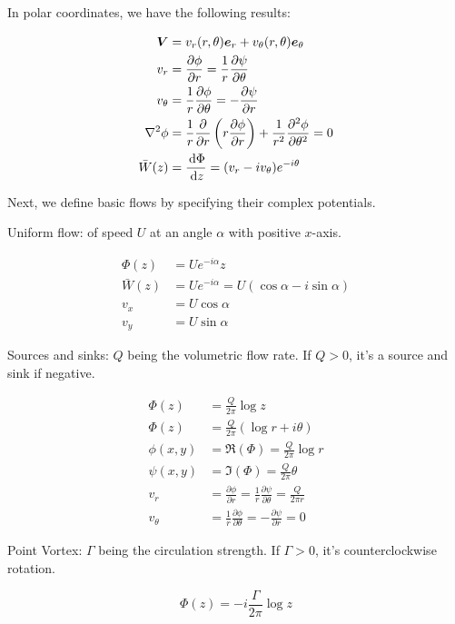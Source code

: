 \documentclass{article}
\begin{document}
In polar coordinates, we have the following results:

\begin{align*}
    \boldsymbol{V} &= v_r(r,\theta)\boldsymbol{e}_r + v_\theta(r,\theta)\boldsymbol{e}_\theta\\
    v_r &= \frac{\partial \phi}{\partial r} = \frac{1}{r}\frac{\partial \psi}{\partial \theta}\\
    v_\theta &= \frac{1}{r}\frac{\partial \phi}{\partial \theta} = -\frac{\partial\psi}{\partial r}\\
    \nabla^2\phi &= \frac{1}{r} \frac{\partial}{\partial r}\left( r\frac{\partial \phi}{\partial r} \right) + \frac{1}{r^2} \frac{\partial ^2\phi}{\partial \theta^2} = 0\\
    \bar W(z) &= \frac{\,\mathrm{d} \Phi}{\,\mathrm{d} z} = (v_r-iv_\theta)e^{-i\theta}
\end{align*}

Next, we define basic flows by specifying their complex potentials. 

Uniform flow: of speed \(U\) at an angle \(\alpha\) with positive \(x\)-axis.

\begin{align*}
    \Phi(z) &= Ue^{-i\alpha}z\\
    \bar W(z) &= Ue^{-i\alpha}=U(\cos \alpha-i\sin\alpha)\\
    v_x &= U\cos \alpha\\
    v_y &= U\sin\alpha
\end{align*}

Sources and sinks: \(Q\) being the volumetric flow rate. If \(Q>0\), it's a source and sink if negative.

\begin{align*}
    \Phi(z) &= \frac{Q}{2\pi} \log z\\
    \Phi(z) &= \frac{Q}{2\pi}( \log r+i\theta)\\
    \phi(x,y) &= \Re(\Phi)=\frac{Q}{2\pi} \log r\\
    \psi(x,y) &= \Im(\Phi) =\frac{Q}{2\pi}\theta\\
    v_r &= \frac{\partial \phi}{\partial r}= \frac{1}{r}\frac{\partial\psi}{\partial \theta}= \frac{Q}{2\pi r}\\
    v_\theta &= \frac{1}{r}\frac{\partial \phi}{\partial \theta} = -\frac{\partial \psi}{\partial r} = 0
\end{align*}

Point Vortex: \(\Gamma\) being the circulation strength. If \(\Gamma>0\), it's counterclockwise rotation.

\[\Phi(z) = -i\frac{\Gamma}{2\pi} \log z\]
\end{document}
